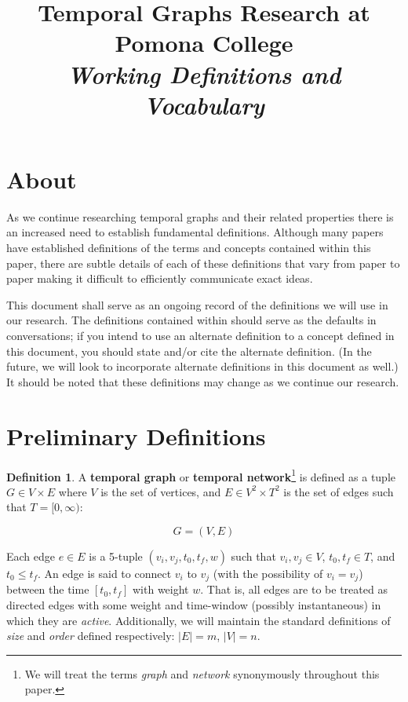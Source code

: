 \documentclass{article}
\theoremstyle{definition}
\newtheorem{defn}[thm]{Definition}
\numberwithin{thm}{subsection}
\begin{document}
\title{Temporal Graphs Research at Pomona College\\
  \textit{Working Definitions and Vocabulary}
}
\maketitle

\section{About}

As we continue researching temporal graphs and their related properties there is
an increased need to establish fundamental definitions. Although many papers
have established definitions of the terms and concepts contained within this
paper, there are subtle details of each of these definitions that vary from
paper to paper making it difficult to efficiently communicate exact ideas.

This document shall serve as an ongoing record of the definitions we will use
in our research. The definitions contained within should serve as the defaults
in conversations; if you intend to use an alternate definition to a concept
defined in this document, you should state and/or cite the alternate definition.
(In the future, we will look to incorporate alternate definitions in this
document as well.) It should be noted that these definitions may change as we
continue our research.

\section{Preliminary Definitions}

\begin{defn}
  A \textbf{temporal graph} or \textbf{temporal network}\footnote{We will treat
  the terms \textit{graph} and \textit{network} synonymously throughout this
  paper.} is defined as a tuple $G \in V \times E$ where $V$ is the set of
  vertices, and $E \in V^2 \times T^2$ is the set of edges such that
  $T = [0, \infty)$:

  \[ G = (V, E) \]

  Each edge $e \in E$ is a 5-tuple $(v_i, v_j, t_0, t_f, w)$ such that
  $v_i, v_j \in V$, $t_0, t_f \in T$, and $t_0 \leq t_f$. An edge is said to
  connect $v_i$ to $v_j$ (with the possibility of $v_i = v_j$) between the time
  $[t_0, t_f]$ with weight $w$. That is, all edges are to be treated as directed
  edges with some weight and time-window (possibly instantaneous) in which they
  are \textit{active}. Additionally, we will maintain the standard definitions
  of \textit{size} and \textit{order} defined respectively: $|E| = m$,
  $|V| = n$.
\end{defn}
\end{document}
